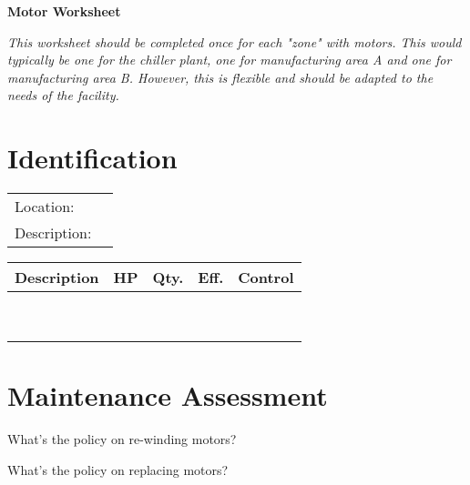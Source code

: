 \documentclass[./main.tex]{subfiles}
\begin{document}
\begin{center}
\Large\textbf{Motor Worksheet}
\end{center}

\noindent \emph{This worksheet should be completed once for each "zone" with motors. This would typically be one for the chiller plant, one for manufacturing area A and one for manufacturing area B. However, this is flexible and should be adapted to the needs of the facility. }

\section*{Identification}
\noindent\begin{tabularx}{\textwidth}{@{}lX@{}}
Location: & \hrulefill \\[2ex]
Description: & \hrulefill \\[2ex]

\end{tabularx}

\begin{table}[h!]
\centering
\begin{tabular}{|p{7cm}|p{1.5cm}|p{1.5cm}|p{1.5cm}|p{2.5cm}|}
\hline
Description & HP & Qty. & Eff. & Control\\
\hline
 & & & & \\[1cm]
\hline
 & & & & \\[1cm]
\hline
 & & & & \\[1cm]
\hline
 & & & & \\[1cm]
\hline
 & & & & \\[1cm]
\hline
 & & & & \\[1cm]
\hline
 & & & & \\[1cm]
\hline
 & & & & \\[1cm]
\hline
 & & & & \\[1cm]
\hline


\end{tabular}
\end{table}

\clearpage \section*{Maintenance Assessment}

\noindent What's the policy on re-winding motors? 

\vspace{\answerspace}

\noindent What's the policy on replacing motors? 
\end{document}

